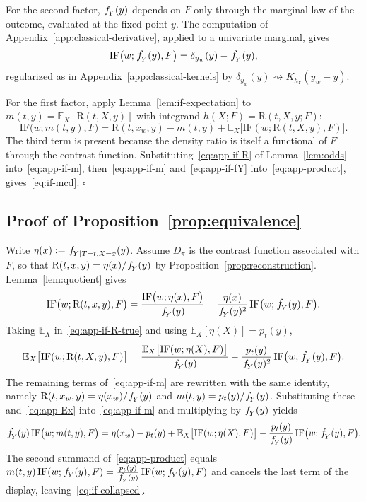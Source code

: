 \documentclass[11pt]{article}
\theoremstyle{plain}
\theoremstyle{definition}
\theoremstyle{remark}
\newcommand{\pE}{\ensuremath{\mathbb{E}}}
\newcommand{\pf}[1]{\ensuremath{\,\mathlarger{\textit{f}}_{#1}}}
\newcommand{\ratio}{\ensuremath{\pi}}
\newcommand{\contrast}{D_{\ratio}}
\newcommand{\DensityRatio}{\text{R}}
\newcommand{\IF}{\mathrm{IF}}
\begin{document}
For the second factor, $\pf{Y}(y)$ depends on $F$ only through the marginal law of the
outcome, evaluated at the fixed point $y$. The computation of
Appendix~\ref{app:classical-derivative}, applied to a univariate marginal, gives
\begin{equation}
\IF\big(w;\pf{Y}(y),F\big) = \delta_{y_w}(y) - \pf{Y}(y),
\label{eq:app-if-fY}
\end{equation}
regularized as in Appendix~\ref{app:classical-kernels} by
$\delta_{y_w}(y) \rightsquigarrow K_{h_Y}(y_w - y)$.

For the first factor, apply Lemma~\ref{lem:if-expectation} to
$m(t,y) = \pE_X[\DensityRatio(t,X,y)]$ with integrand $h(X;F) = \DensityRatio(t,X,y;F)$:
\begin{equation}
\IF\big(w;m(t,y),F\big)
= \DensityRatio(t,x_w,y) - m(t,y)
+ \pE_X\big[ \IF(w;\DensityRatio(t,X,y),F) \big].
\label{eq:app-if-m}
\end{equation}
The third term is present because the density ratio is itself a functional of $F$ through
the contrast function. Substituting~\eqref{eq:app-if-R} of Lemma~\ref{lem:odds}
into~\eqref{eq:app-if-m}, then~\eqref{eq:app-if-m} and~\eqref{eq:app-if-fY}
into~\eqref{eq:app-product}, gives~\eqref{eq:if-mcd}. \hfill$\square$

\subsection{Proof of Proposition~\ref{prop:equivalence}}
\label{app:mcd-equivalence}

Write $\eta(x) := \pf{Y \mid T=t,X=x}(y)$. Assume $\contrast$ is the contrast function
associated with $F$, so that $\DensityRatio(t,x,y) = \eta(x)/\pf{Y}(y)$ by
Proposition~\ref{prop:reconstruction}. Lemma~\ref{lem:quotient} gives
\begin{equation}
\IF\big(w;\DensityRatio(t,x,y),F\big)
= \frac{\IF\big(w;\eta(x),F\big)}{\pf{Y}(y)}
- \frac{\eta(x)}{\pf{Y}(y)^2}\,\IF\big(w;\pf{Y}(y),F\big).
\label{eq:app-if-R-true}
\end{equation}
Taking $\pE_X$ in~\eqref{eq:app-if-R-true} and using $\pE_X[\eta(X)] = p_t(y)$,
\begin{equation}
\pE_X\big[ \IF(w;\DensityRatio(t,X,y),F) \big]
= \frac{\pE_X\big[ \IF(w;\eta(X),F) \big]}{\pf{Y}(y)}
- \frac{p_t(y)}{\pf{Y}(y)^2}\,\IF\big(w;\pf{Y}(y),F\big).
\label{eq:app-Ex}
\end{equation}
The remaining terms of~\eqref{eq:app-if-m} are rewritten with the same identity, namely
$\DensityRatio(t,x_w,y) = \eta(x_w)/\pf{Y}(y)$ and
$m(t,y) = p_t(y)/\pf{Y}(y)$. Substituting these and~\eqref{eq:app-Ex}
into~\eqref{eq:app-if-m} and multiplying by $\pf{Y}(y)$ yields
\[
\pf{Y}(y)\,\IF\big(w;m(t,y),F\big)
= \eta(x_w) - p_t(y) + \pE_X\big[ \IF(w;\eta(X),F) \big]
- \frac{p_t(y)}{\pf{Y}(y)}\,\IF\big(w;\pf{Y}(y),F\big).
\]
The second summand of~\eqref{eq:app-product} equals
$m(t,y)\,\IF(w;\pf{Y}(y),F) = \frac{p_t(y)}{\pf{Y}(y)}\,\IF(w;\pf{Y}(y),F)$ and cancels
the last term of the display, leaving~\eqref{eq:if-collapsed}.
\end{document}
